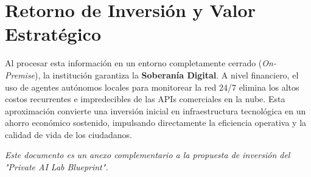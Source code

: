 \documentclass[11pt,a4paper]{article}
\begin{document}
\section*{Retorno de Inversión y Valor Estratégico}
Al procesar esta información en un entorno completamente cerrado (\textit{On-Premise}), la institución garantiza la \textbf{Soberanía Digital}. A nivel financiero, el uso de agentes autónomos locales para monitorear la red 24/7 elimina los altos costos recurrentes e impredecibles de las APIs comerciales en la nube. Esta aproximación convierte una inversión inicial en infraestructura tecnológica en un ahorro económico sostenido, impulsando directamente la eficiencia operativa y la calidad de vida de los ciudadanos.

\vspace{1cm}
\begin{center}
    \textit{Este documento es un anexo complementario a la propuesta de inversión del "Private AI Lab Blueprint".}
\end{center}
\end{document}
